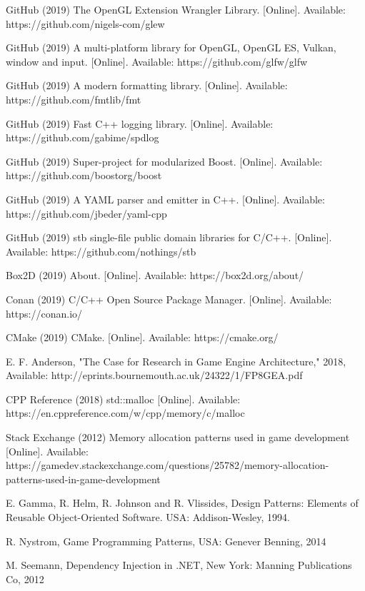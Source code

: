 \begin{thebibliography}{1}
GitHub (2019) The OpenGL Extension Wrangler Library. [Online]. Available: https://github.com/nigels-com/glew

GitHub (2019) A multi-platform library for OpenGL, OpenGL ES, Vulkan, window and input. [Online]. Available: https://github.com/glfw/glfw

GitHub (2019) A modern formatting library. [Online]. Available: https://github.com/fmtlib/fmt

GitHub (2019) Fast C++ logging library. [Online]. Available: https://github.com/gabime/spdlog

GitHub (2019) Super-project for modularized Boost. [Online]. Available: https://github.com/boostorg/boost

GitHub (2019) A YAML parser and emitter in C++. [Online]. Available: https://github.com/jbeder/yaml-cpp

GitHub (2019) stb single-file public domain libraries for C/C++. [Online]. Available: https://github.com/nothings/stb

Box2D (2019) About. [Online]. Available: https://box2d.org/about/

Conan (2019) C/C++ Open Source Package Manager. [Online]. Available: https://conan.io/

CMake (2019) CMake. [Online]. Available: https://cmake.org/

E. F. Anderson, "The Case for Research in Game Engine Architecture," 2018, Available: http://eprints.bournemouth.ac.uk/24322/1/FP8GEA.pdf

CPP Reference (2018) std::malloc [Online]. Available: https://en.cppreference.com/w/cpp/memory/c/malloc

Stack Exchange (2012) Memory allocation patterns used in game development [Online]. Available: https://gamedev.stackexchange.com/questions/25782/memory-allocation-patterns-used-in-game-development

E. Gamma, R. Helm, R. Johnson and R. Vlissides, Design Patterns: Elements of Reusable Object-Oriented Software. USA: Addison-Wesley, 1994.

R. Nystrom, Game Programming Patterns, USA: Genever Benning, 2014

M. Seemann, Dependency Injection in .NET, New York: Manning Publications Co, 2012


\end{thebibliography}
